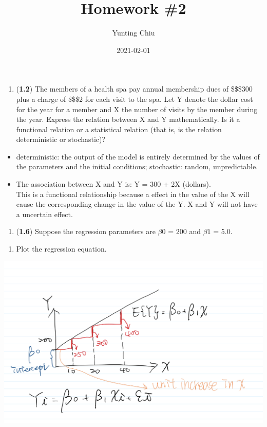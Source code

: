 \documentclass[
]{article}
\title{Homework \#2}
\author{Yunting Chiu}
\date{2021-02-01}
\providecommand{\tightlist}{%
  \setlength{\itemsep}{0pt}\setlength{\parskip}{0pt}}
\begin{document}
\maketitle

\begin{enumerate}
\def\labelenumi{\arabic{enumi}.}
\tightlist
\item
  (\textbf{1.2}) The members of a health spa pay annual membership dues
  of \$\$\$300 plus a charge of \$\$\$2 for each visit to the spa. Let Y
  denote the dollar cost for the year for a member and X the number of
  visits by the member during the year. Express the relation between X
  and Y mathematically. Is it a functional relation or a statistical
  relation (that is, is the relation deterministic or stochastic)?
\end{enumerate}

\begin{itemize}
\tightlist
\item
  deterministic: the output of the model is entirely determined by the
  values of the parameters and the initial conditions; stochastic:
  random, unpredictable.
\item
  The association between X and Y is: Y = 300 + 2X (dollars).\\
  This is a functional relationship because a effect in the value of the
  X will cause the corresponding change in the value of the Y. X and Y
  will not have a uncertain effect.
\end{itemize}

\begin{enumerate}
\def\labelenumi{\arabic{enumi}.}
\setcounter{enumi}{1}
\tightlist
\item
  (\textbf{1.6}) Suppose the regression parameters are \(\beta0\) = 200
  and \(\beta1\) = 5.0.\\
\end{enumerate}

\begin{enumerate}
\def\labelenumi{(\alph{enumi})}
\tightlist
\item
  Plot the regression equation.\\
\end{enumerate}

\includegraphics{pics/IMG_445592DDC4E5-1.jpeg}
\end{document}
